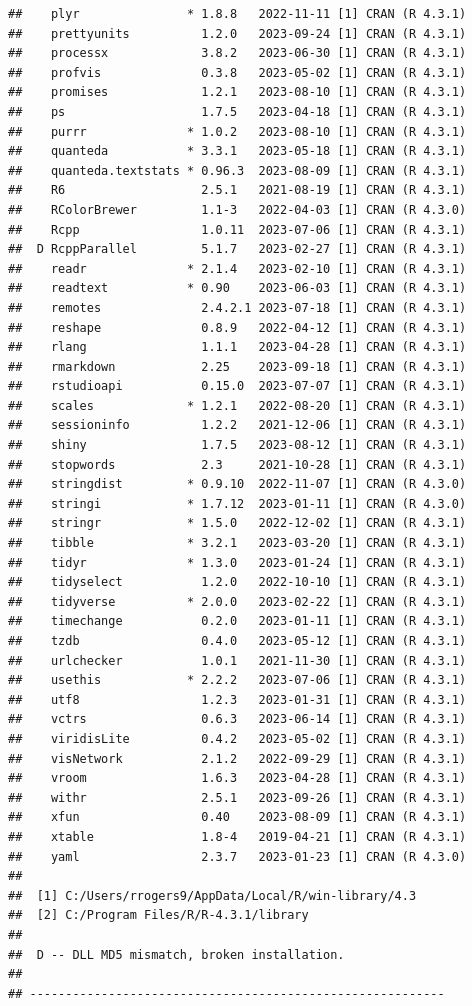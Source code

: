 \documentclass[print]{nuthesis}
\begin{document}
\begin{verbatim}
##    plyr               * 1.8.8   2022-11-11 [1] CRAN (R 4.3.1)
##    prettyunits          1.2.0   2023-09-24 [1] CRAN (R 4.3.1)
##    processx             3.8.2   2023-06-30 [1] CRAN (R 4.3.1)
##    profvis              0.3.8   2023-05-02 [1] CRAN (R 4.3.1)
##    promises             1.2.1   2023-08-10 [1] CRAN (R 4.3.1)
##    ps                   1.7.5   2023-04-18 [1] CRAN (R 4.3.1)
##    purrr              * 1.0.2   2023-08-10 [1] CRAN (R 4.3.1)
##    quanteda           * 3.3.1   2023-05-18 [1] CRAN (R 4.3.1)
##    quanteda.textstats * 0.96.3  2023-08-09 [1] CRAN (R 4.3.1)
##    R6                   2.5.1   2021-08-19 [1] CRAN (R 4.3.1)
##    RColorBrewer         1.1-3   2022-04-03 [1] CRAN (R 4.3.0)
##    Rcpp                 1.0.11  2023-07-06 [1] CRAN (R 4.3.1)
##  D RcppParallel         5.1.7   2023-02-27 [1] CRAN (R 4.3.1)
##    readr              * 2.1.4   2023-02-10 [1] CRAN (R 4.3.1)
##    readtext           * 0.90    2023-06-03 [1] CRAN (R 4.3.1)
##    remotes              2.4.2.1 2023-07-18 [1] CRAN (R 4.3.1)
##    reshape              0.8.9   2022-04-12 [1] CRAN (R 4.3.1)
##    rlang                1.1.1   2023-04-28 [1] CRAN (R 4.3.1)
##    rmarkdown            2.25    2023-09-18 [1] CRAN (R 4.3.1)
##    rstudioapi           0.15.0  2023-07-07 [1] CRAN (R 4.3.1)
##    scales             * 1.2.1   2022-08-20 [1] CRAN (R 4.3.1)
##    sessioninfo          1.2.2   2021-12-06 [1] CRAN (R 4.3.1)
##    shiny                1.7.5   2023-08-12 [1] CRAN (R 4.3.1)
##    stopwords            2.3     2021-10-28 [1] CRAN (R 4.3.1)
##    stringdist         * 0.9.10  2022-11-07 [1] CRAN (R 4.3.0)
##    stringi            * 1.7.12  2023-01-11 [1] CRAN (R 4.3.0)
##    stringr            * 1.5.0   2022-12-02 [1] CRAN (R 4.3.1)
##    tibble             * 3.2.1   2023-03-20 [1] CRAN (R 4.3.1)
##    tidyr              * 1.3.0   2023-01-24 [1] CRAN (R 4.3.1)
##    tidyselect           1.2.0   2022-10-10 [1] CRAN (R 4.3.1)
##    tidyverse          * 2.0.0   2023-02-22 [1] CRAN (R 4.3.1)
##    timechange           0.2.0   2023-01-11 [1] CRAN (R 4.3.1)
##    tzdb                 0.4.0   2023-05-12 [1] CRAN (R 4.3.1)
##    urlchecker           1.0.1   2021-11-30 [1] CRAN (R 4.3.1)
##    usethis            * 2.2.2   2023-07-06 [1] CRAN (R 4.3.1)
##    utf8                 1.2.3   2023-01-31 [1] CRAN (R 4.3.1)
##    vctrs                0.6.3   2023-06-14 [1] CRAN (R 4.3.1)
##    viridisLite          0.4.2   2023-05-02 [1] CRAN (R 4.3.1)
##    visNetwork           2.1.2   2022-09-29 [1] CRAN (R 4.3.1)
##    vroom                1.6.3   2023-04-28 [1] CRAN (R 4.3.1)
##    withr                2.5.1   2023-09-26 [1] CRAN (R 4.3.1)
##    xfun                 0.40    2023-08-09 [1] CRAN (R 4.3.1)
##    xtable               1.8-4   2019-04-21 [1] CRAN (R 4.3.1)
##    yaml                 2.3.7   2023-01-23 [1] CRAN (R 4.3.0)
## 
##  [1] C:/Users/rrogers9/AppData/Local/R/win-library/4.3
##  [2] C:/Program Files/R/R-4.3.1/library
## 
##  D -- DLL MD5 mismatch, broken installation.
## 
## ----------------------------------------------------------
\end{verbatim}
\end{document}
